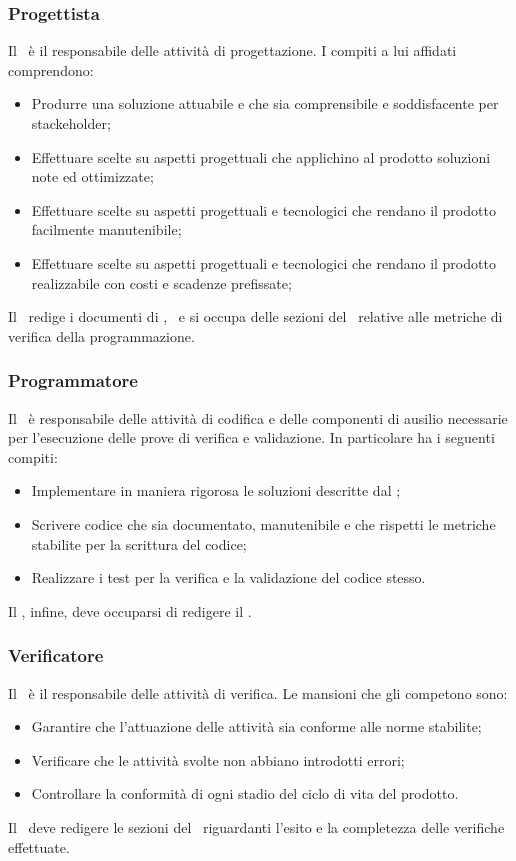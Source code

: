 \documentclass[../NormeProgetto.tex]{subfiles}
\begin{document}
		\subsubsection{Progettista}
		Il \progettista\ è il responsabile delle attività di progettazione. I compiti a lui affidati comprendono:
		\begin{itemize}
		\item Produrre una soluzione attuabile e che sia comprensibile e soddisfacente per stackeholder;
		\item Effettuare scelte su aspetti progettuali che applichino al prodotto soluzioni note ed ottimizzate;
		\item Effettuare scelte su aspetti progettuali e tecnologici che rendano il prodotto facilmente manutenibile;
		\item Effettuare scelte su aspetti progettuali e tecnologici che rendano il prodotto realizzabile con costi e scadenze prefissate;
		\end{itemize}
		Il \progettista\ redige i documenti di \specificatecnica, \ e si occupa delle sezioni del \pianodiqualifica\ relative alle metriche di verifica della programmazione.
		\subsubsection{Programmatore}
		Il \programmatore\ è responsabile delle attività di codifica e delle componenti di ausilio necessarie per l'esecuzione delle prove di verifica e validazione. In particolare ha i seguenti compiti:
		\begin{itemize}
		\item Implementare in maniera rigorosa le soluzioni descritte dal \progettista;
		\item Scrivere codice che sia documentato, manutenibile e che rispetti le metriche stabilite per la scrittura del codice;
		\item Realizzare i test per la verifica e la validazione del codice stesso.
		\end{itemize}
		Il \programmatore, infine, deve occuparsi di redigere il \manualeutente.
		\subsubsection{Verificatore}
		Il \verificatore\ è il responsabile delle attività di verifica. Le mansioni che gli competono sono:
		\begin{itemize}
		\item Garantire che l'attuazione delle attività sia conforme alle norme stabilite;
		\item Verificare che le attività svolte non abbiano introdotti errori;
		\item Controllare la conformità di ogni stadio del ciclo di vita del prodotto.
		\end{itemize}
		Il \verificatore\ deve redigere le sezioni del \pianodiqualifica\ riguardanti l'esito e la completezza delle verifiche effettuate.
\end{document}
